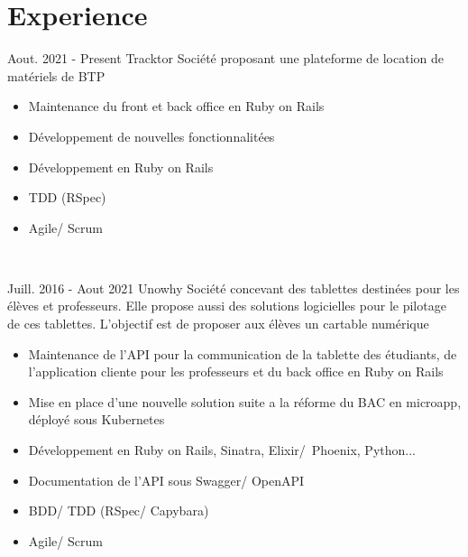 \documentclass[letterpaper]{twentysecondcv} %
\begin{document}
\makeprofile %


\section{Experience}
\large

\begin{twenty} %

\twentyitem
    	{Aout. 2021 - }
		{Present}
        {Tracktor}
        {}
        {Société proposant une plateforme de location de matériels de BTP}
        {\begin{itemize}
        \item Maintenance du front et back office  en Ruby on Rails
        \item Développement de nouvelles fonctionnalitées
        \item Développement en Ruby on Rails
        \item TDD (RSpec)
        \item Agile/ Scrum
        
        \end{itemize}}
        \\
\end{twenty}

\begin{twenty}
\twentyitem
    	{Juill. 2016 - }
		{Aout 2021}
        {Unowhy}
        {}
        {Société concevant des tablettes destinées pour les élèves et professeurs. Elle propose aussi des solutions logicielles pour le pilotage de ces tablettes. L'objectif est de proposer aux élèves un cartable numérique}
        {\begin{itemize}
        \item Maintenance de l'API pour la communication de la tablette des étudiants, de l'application cliente pour les professeurs et du back office en Ruby on Rails
        \item Mise en place d'une nouvelle solution suite a la réforme du BAC en microapp, déployé sous Kubernetes
        \item Développement en Ruby on Rails, Sinatra, \mbox{Elixir/ Phoenix}, Python...
        \item Documentation de l'API sous Swagger/ OpenAPI
        \item BDD/ TDD (RSpec/ Capybara)
        \item Agile/ Scrum
        
        \end{itemize}}
        \\
\end{twenty}
\end{document}
